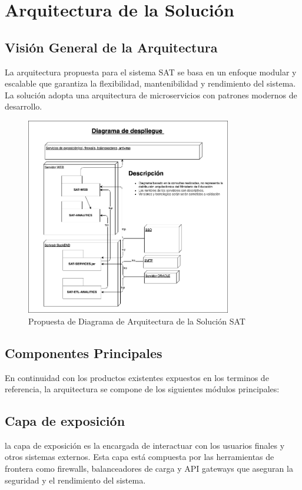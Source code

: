 \section{Arquitectura de la Solución}

\subsection{Visión General de la Arquitectura}

La arquitectura propuesta para el sistema SAT se basa en un enfoque modular y escalable que garantiza la flexibilidad, mantenibilidad y rendimiento del sistema. La solución adopta una arquitectura de microservicios con patrones modernos de desarrollo.

\begin{figure}[h]
\centering
\includegraphics[width=0.8\textwidth]{graficos/arquitectura.png}
\caption{Propuesta de Diagrama de Arquitectura de la Solución SAT}
\label{fig:arquitectura}
\end{figure}

\subsection{Componentes Principales}
En continuidad con los productos existentes expuestos en los terminos de referencia, la arquitectura se compone de los siguientes módulos principales:

\subsection{Capa de exposición}
la capa de exposición es la encargada de interactuar con los usuarios finales y otros sistemas externos. Esta capa está compuesta por las herramientas de frontera como firewalls, balanceadores de carga y API gateways que aseguran la seguridad y el rendimiento del sistema.

